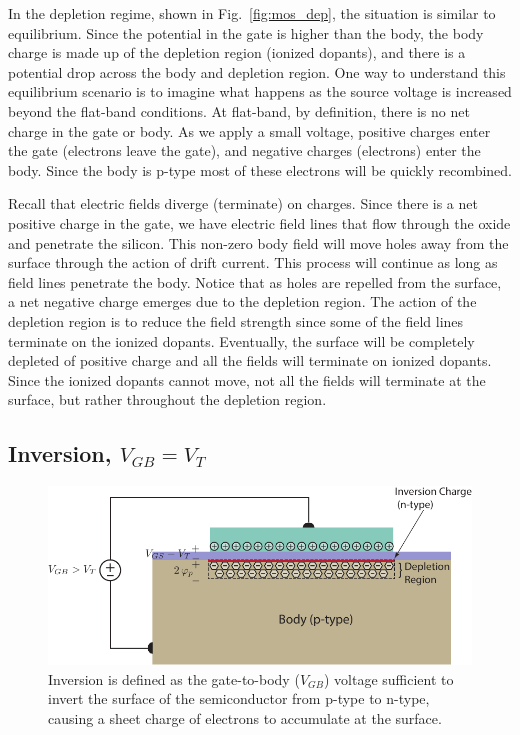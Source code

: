 In the depletion regime, shown in Fig.~\ref{fig:mos_dep}, the situation is similar to equilibrium.  Since the potential in the gate is higher than the body, the body charge is made up of the depletion region (ionized dopants), and there is a potential drop across the body and depletion region.  One way to understand this equilibrium scenario is to imagine what happens as the source voltage is increased beyond the flat-band conditions.  At flat-band, by definition, there is no net charge in the gate or body.  As we apply a small voltage, positive charges enter the gate (electrons leave the gate), and negative charges (electrons) enter the body. Since the body is p-type most of these electrons will be quickly recombined.  

Recall that electric fields diverge (terminate) on charges.  Since there is a net positive charge in the gate, we have electric field lines that flow through the oxide and penetrate the silicon.  This non-zero body field will move holes away from the surface through the action of drift current.  This process will continue as long as field lines penetrate the body.   Notice that as holes are repelled from the surface, a net negative charge emerges due to the depletion region.  The action of the depletion region is to reduce the field strength since some of the field lines terminate on the ionized dopants.  Eventually, 
the surface will be completely depleted of positive charge and all the fields will terminate on ionized dopants.  Since the ionized dopants cannot move, not all the fields will terminate at the surface, but rather throughout the depletion region.  

 
\subsection{Inversion, $V_{GB} = V_T$}

\begin{figure}[tbh]
\begin{center}
\includegraphics[width=.75\columnwidth]{mos_cap_inversion}
\end{center}
\caption{Inversion is defined as the gate-to-body ($V_{GB}$) voltage sufficient to invert the surface of the semiconductor from p-type to n-type, causing a sheet charge of electrons to accumulate at the surface. } \label{fig:mos_inv}
\end{figure}

